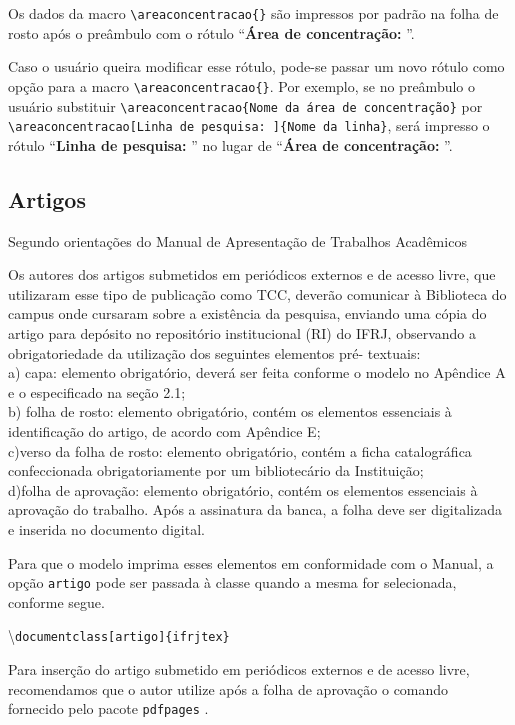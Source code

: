 Os dados da macro \verb|\areaconcentracao{}| são impressos por padrão na folha de rosto após o preâmbulo com o rótulo ``\textbf{Área de concentração: }''.

Caso o usuário queira modificar esse rótulo, pode-se passar um novo rótulo como opção para a macro \verb|\areaconcentracao{}|. Por exemplo, se no preâmbulo o usuário substituir \verb|\areaconcentracao{Nome da área de concentração}| por \\ \verb|\areaconcentracao[Linha de pesquisa: ]{Nome da linha}|, será impresso o rótulo ``\textbf{Linha de pesquisa: }'' no lugar de ``\textbf{Área de concentração: }''.

\subsection{Artigos}
Segundo orientações do Manual de Apresentação de Trabalhos Acadêmicos
\begin{citacao}
Os autores dos artigos submetidos em periódicos externos e de acesso livre, que utilizaram esse tipo de publicação como TCC, deverão comunicar à
Biblioteca do campus onde cursaram sobre a existência da pesquisa, enviando uma cópia do artigo para depósito no repositório institucional (RI) do IFRJ, observando a obrigatoriedade da utilização dos seguintes elementos pré- textuais:\\
    a) capa: elemento obrigatório, deverá ser feita conforme o modelo no Apêndice A e o especificado na seção 2.1;\\
    b) folha de rosto: elemento obrigatório, contém os elementos essenciais à identificação do artigo, de acordo com Apêndice E;\\
   c)verso da folha de rosto: elemento obrigatório, contém a ficha catalográfica confeccionada obrigatoriamente por um bibliotecário da Instituição;\\
    d)folha de aprovação: elemento obrigatório, contém os elementos essenciais à aprovação do trabalho. Após a assinatura da banca, a folha deve ser digitalizada e inserida no documento digital. \cite{ifrjtccs}
\end{citacao}

Para que o modelo imprima esses elementos em conformidade com o Manual, a opção \verb|artigo| pode ser passada à classe quando a mesma for selecionada, conforme segue.

\textbackslash\texttt{documentclass[artigo]\{ifrjtex\}}

Para inserção do artigo submetido em periódicos externos e de acesso livre, recomendamos que o autor utilize após a folha de aprovação o comando \\ \noindent\verb|| fornecido pelo pacote \verb|pdfpages| \cite{pdfpages}.





